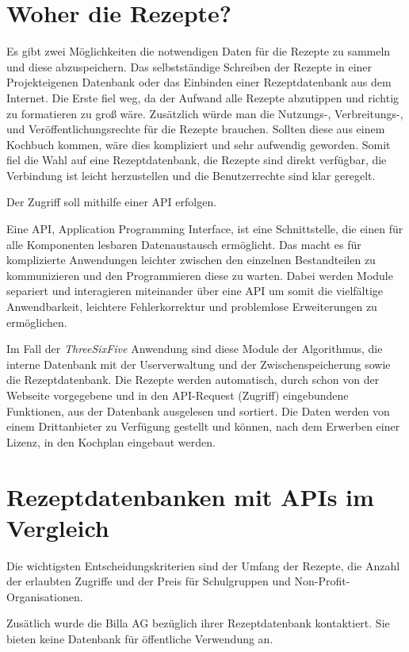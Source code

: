 \section{Woher die Rezepte?}
Es gibt zwei Möglichkeiten die notwendigen Daten für die Rezepte zu sammeln und diese abzuspeichern. Das selbstständige Schreiben der Rezepte in einer Projekteigenen Datenbank oder das Einbinden einer Rezeptdatenbank aus dem Internet. Die Erste fiel weg, da der Aufwand alle Rezepte abzutippen und richtig zu formatieren zu groß wäre. Zusätzlich würde man die Nutzungs-, Verbreitungs-, und Veröffentlichungsrechte für die Rezepte brauchen. Sollten diese aus einem Kochbuch kommen, wäre dies kompliziert und sehr aufwendig geworden.
Somit fiel die Wahl auf eine Rezeptdatenbank, die Rezepte sind direkt verfügbar, die Verbindung ist leicht herzustellen und die Benutzerrechte sind klar geregelt.

Der Zugriff soll mithilfe einer API\cite{apidef} erfolgen.

Eine API, Application Programming Interface, ist eine Schnittstelle, die einen für alle Komponenten lesbaren Datenaustausch ermöglicht. Das macht es für komplizierte Anwendungen leichter zwischen den einzelnen Bestandteilen zu kommunizieren und den Programmieren diese zu warten. Dabei werden Module separiert und interagieren miteinander über eine API um somit die vielfältige Anwendbarkeit, leichtere Fehlerkorrektur und problemlose Erweiterungen zu ermöglichen.

Im Fall der \textit{ThreeSixFive} Anwendung sind diese Module der Algorithmus, die interne Datenbank mit der Userverwaltung und der Zwischenspeicherung sowie die Rezeptdatenbank. Die Rezepte werden automatisch, durch schon von der Webseite vorgegebene und in den API-Request (Zugriff) eingebundene Funktionen, aus der Datenbank ausgelesen und sortiert. Die Daten werden von einem Drittanbieter zu Verfügung gestellt und können, nach dem Erwerben einer Lizenz, in den Kochplan eingebaut werden.

\section{Rezeptdatenbanken mit APIs im Vergleich}

Die wichtigsten Entscheidungskriterien sind der Umfang der Rezepte, die Anzahl der erlaubten Zugriffe und der Preis für Schulgruppen und Non-Profit-Organisationen.



Zusätlich wurde die Billa AG bezüglich ihrer Rezeptdatenbank kontaktiert. Sie bieten keine Datenbank für öffentliche Verwendung an. 

